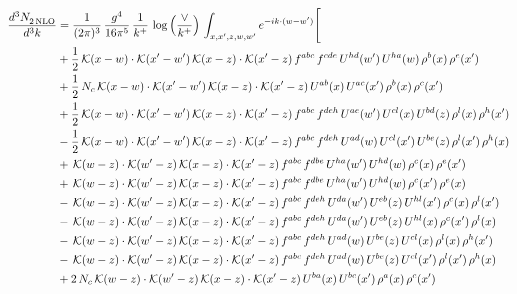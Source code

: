 \documentclass[9pt]{article}
\numberwithin{equation}{section}
\begin{document}
\begin{align}
    \frac{d^{3}N_{2\,\rm NLO}^{\rm}}{d^{3}k}  & = \frac{1}{(2\pi)^{3}}\,\frac{g^{4}}{16\pi^{5}}\,\frac{1}{k^{+}}\,\log{\left(\frac{\vee}{k^{+}}\right)}\, \int_{x,x',z,w,w'}e^{-ik\cdot (w-w')}\Bigg[\notag\\ & +\frac{1}{2}\,\mathcal{K}(x-w)\cdot\mathcal{K}(x'-w')\,\mathcal{K}(x-z)\cdot\mathcal{K}(x'-z)\,f^{abc}\,f^{cde}\,U^{hd}(w')\,U^{ha}(w)\,\rho^{b}(x)\,\rho^{e}(x')\notag \\ 
&+\frac{1}{2}\,N_{c}\,\mathcal{K}(x-w)\cdot\mathcal{K}(x'-w')\,\mathcal{K}(x-z)\cdot\mathcal{K}(x'-z)\,U^{ab}(x)\,U^{ac}(x')\,\rho^{b}(x)\,\rho^{c}(x')\notag \\ 
&+\frac{1}{2}\,\mathcal{K}(x-w)\cdot\mathcal{K}(x'-w')\,\mathcal{K}(x-z)\cdot\mathcal{K}(x'-z)\,f^{abc}\,f^{deh}\,U^{ae}(w')\,U^{cl}(x)\,U^{bd}(z)\,\rho^{l}(x)\,\rho^{h}(x')\notag \\ 
&-\frac{1}{2}\,\mathcal{K}(x-w)\cdot\mathcal{K}(x'-w')\,\mathcal{K}(x-z)\cdot\mathcal{K}(x'-z)\,f^{abc}\,f^{deh}\,U^{ad}(w)\,U^{cl}(x')\,U^{be}(z)\,\rho^{l}(x')\,\rho^{h}(x)\notag \\ 
&+\,\mathcal{K}(w-z)\cdot\mathcal{K}(w'-z)\,\mathcal{K}(x-z)\cdot\mathcal{K}(x'-z)\,f^{abc}\,f^{dbe}\,U^{ha}(w')\,U^{hd}(w)\,\rho^{c}(x)\,\rho^{e}(x')\notag \\ 
&+\,\mathcal{K}(w-z)\cdot\mathcal{K}(w'-z)\,\mathcal{K}(x-z)\cdot\mathcal{K}(x'-z)\,f^{abc}\,f^{dbe}\,U^{ha}(w')\,U^{hd}(w)\,\rho^{c}(x')\,\rho^{e}(x)\notag \\ 
&-\,\mathcal{K}(w-z)\cdot\mathcal{K}(w'-z)\,\mathcal{K}(x-z)\cdot\mathcal{K}(x'-z)\,f^{abc}\,f^{deh}\,U^{da}(w')\,U^{eb}(z)\,U^{hl}(x')\,\rho^{c}(x)\,\rho^{l}(x')\notag \\ 
&-\,\mathcal{K}(w-z)\cdot\mathcal{K}(w'-z)\,\mathcal{K}(x-z)\cdot\mathcal{K}(x'-z)\,f^{abc}\,f^{deh}\,U^{da}(w')\,U^{eb}(z)\,U^{hl}(x)\,\rho^{c}(x')\,\rho^{l}(x)\notag \\ 
&-\,\mathcal{K}(w-z)\cdot\mathcal{K}(w'-z)\,\mathcal{K}(x-z)\cdot\mathcal{K}(x'-z)\,f^{abc}\,f^{deh}\,U^{ad}(w)\,U^{be}(z)\,U^{cl}(x)\,\rho^{l}(x)\,\rho^{h}(x')\notag \\ 
&-\,\mathcal{K}(w-z)\cdot\mathcal{K}(w'-z)\,\mathcal{K}(x-z)\cdot\mathcal{K}(x'-z)\,f^{abc}\,f^{deh}\,U^{ad}(w)\,U^{be}(z)\,U^{cl}(x')\,\rho^{l}(x')\,\rho^{h}(x)\notag \\ 
&+2\,N_{c}\,\mathcal{K}(w-z)\cdot\mathcal{K}(w'-z)\,\mathcal{K}(x-z)\cdot\mathcal{K}(x'-z)\,U^{ba}(x)\,U^{bc}(x')\,\rho^{a}(x)\,\rho^{c}(x')\notag \\ 

\end{align}
\end{document}
